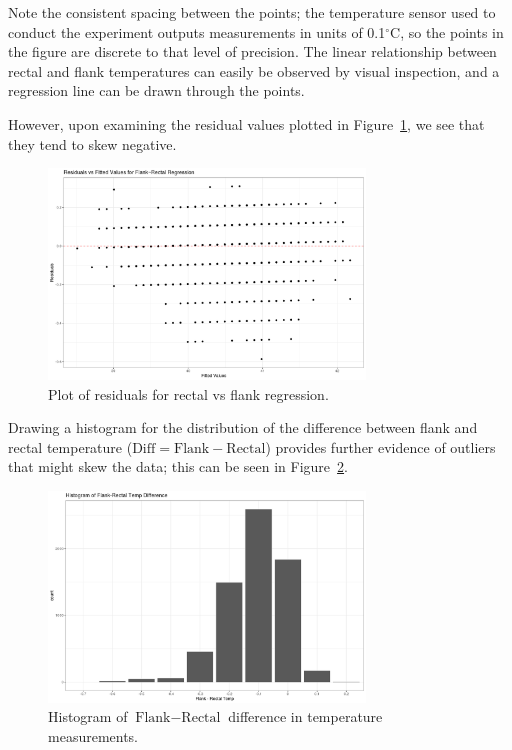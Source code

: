 \documentclass[a4paper, 10pt, titlepage]{article}
\begin{document}
Note the consistent spacing between the points; the temperature sensor used to conduct the experiment outputs measurements in units of 0.1${^\circ}$C, so the points in the figure are discrete to that level of precision. The linear relationship between rectal and flank temperatures can easily be observed by visual inspection, and a regression line can be drawn through the points. 

However, upon examining the residual values plotted in Figure~\ref{figure:rectal wing res}, we see that they tend to skew negative. 

\begin{figure}[]
	\centering
		\includegraphics[width = 0.75\textwidth]{images/flank_rectal_residuals.png}
	\caption{Plot of residuals for rectal vs flank regression.}
	\label{figure:rectal wing res}
\end{figure}

Drawing a histogram for the distribution of the difference between flank and rectal temperature ($\textrm{Diff} = \textrm{Flank} - \textrm{Rectal}$) provides further evidence of outliers that might skew the data; this can be seen in Figure~\ref{figure:rectal wing hist}.

\begin{figure}[]
	\centering
		\includegraphics[width = 0.75\textwidth]{images/flank_rectal_hist.png}
	\caption{Histogram of $\textrm{Flank} - \textrm{Rectal}$ difference in temperature measurements.}
	\label{figure:rectal wing hist}
\end{figure}
\end{document}
